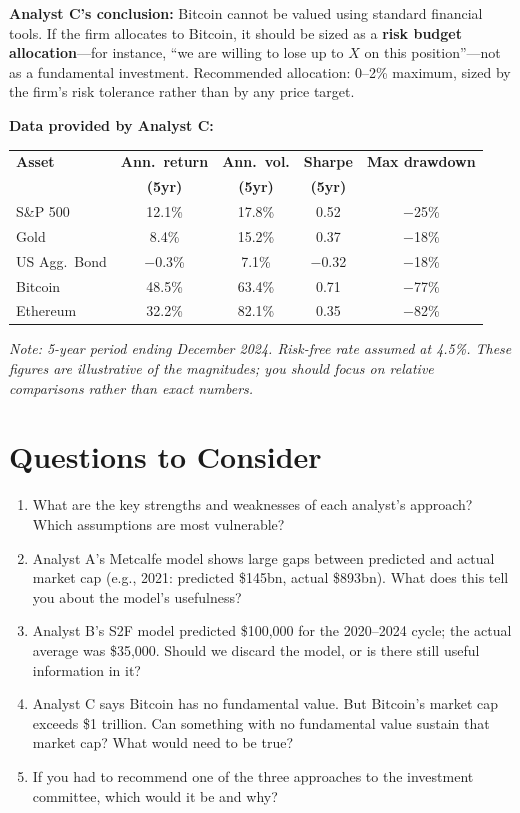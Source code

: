 \documentclass[11pt]{article}
\begin{document}
\medskip
\noindent\textbf{Analyst C's conclusion:} Bitcoin cannot be valued using standard financial tools. If the firm allocates to Bitcoin, it should be sized as a \textbf{risk budget allocation}---for instance, ``we are willing to lose up to $X$ on this position''---not as a fundamental investment. Recommended allocation: 0--2\% maximum, sized by the firm's risk tolerance rather than by any price target.

\medskip
\noindent\textbf{Data provided by Analyst C:}

\begin{center}
\small
\begin{tabular}{lcccc}
\toprule
\textbf{Asset} & \textbf{Ann.\ return} & \textbf{Ann.\ vol.} & \textbf{Sharpe} & \textbf{Max drawdown} \\
 & \textbf{(5yr)} & \textbf{(5yr)} & \textbf{(5yr)} & \\
\midrule
S\&P 500 & 12.1\% & 17.8\% & 0.52 & $-$25\% \\
Gold & 8.4\% & 15.2\% & 0.37 & $-$18\% \\
US Agg.\ Bond & $-$0.3\% & 7.1\% & $-$0.32 & $-$18\% \\
Bitcoin & 48.5\% & 63.4\% & 0.71 & $-$77\% \\
Ethereum & 32.2\% & 82.1\% & 0.35 & $-$82\% \\
\bottomrule
\end{tabular}
\end{center}

\smallskip
\noindent\textit{Note: 5-year period ending December 2024. Risk-free rate assumed at 4.5\%. These figures are illustrative of the magnitudes; you should focus on relative comparisons rather than exact numbers.}

\section*{Questions to Consider}

\begin{enumerate}[leftmargin=*]
\item What are the key strengths and weaknesses of each analyst's approach? Which assumptions are most vulnerable?

\item Analyst A's Metcalfe model shows large gaps between predicted and actual market cap (e.g., 2021: predicted \$145bn, actual \$893bn). What does this tell you about the model's usefulness?

\item Analyst B's S2F model predicted \$100,000 for the 2020--2024 cycle; the actual average was \$35,000. Should we discard the model, or is there still useful information in it?

\item Analyst C says Bitcoin has no fundamental value. But Bitcoin's market cap exceeds \$1 trillion. Can something with no fundamental value sustain that market cap? What would need to be true?

\item If you had to recommend one of the three approaches to the investment committee, which would it be and why?
\end{enumerate}
\end{document}
